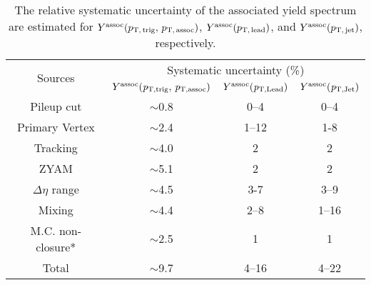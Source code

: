 \begin{table}[!h]
\caption{ The relative systematic uncertainty of the associated yield spectrum are estimated for $Y^{\rm{assoc}}(p_\mathrm{T,\,trig},\,p_\mathrm{T,\,assoc})$, $Y^{\rm{assoc}}(p_\mathrm{T,\,lead})$, and $Y^{\rm{assoc}}(p_\mathrm{T,\,jet})$, respectively.  }
\centering
\begin{tabular}{|c|c|c|c|}
\hline 
\multirow{2}{*}{Sources}  & \multicolumn{3}{c|}{Systematic uncertainty (\%)} \\\cline{2-4}
         & $Y^{\rm{assoc}}(\it{p}_{\rm{T, trig}},\,\it{p}_{\rm{T, assoc}})$ & $Y^{\rm{assoc}}(\it{p}_{\rm{T, Lead}})$ & $Y^{\rm{assoc}}(\it{p}_{\rm{T, Jet}})$ \\ \hline \hline
Pileup cut			& $\sim$0.8	&0--4		&0--4		\\ \hline
Primary Vertex		& $\sim$2.4	&1--12	&1-8		\\ \hline

Tracking			& $\sim$4.0 	&2		&2		\\ \hline

ZYAM			& $\sim$5.1	&2		&2		\\ \hline
$\Delta\eta$ range	& $\sim$4.5	&3-7		&3--9		\\ \hline

Mixing			& $\sim$4.4	&2--8		&1--16	\\ \hline

M.C. non-closure*	& $\sim$2.5 	&1		&1		\\ \hline
Total 			& $\sim$9.7	&4--16	&4--22	\\ 
\hline 
\end{tabular}

\end{table}

